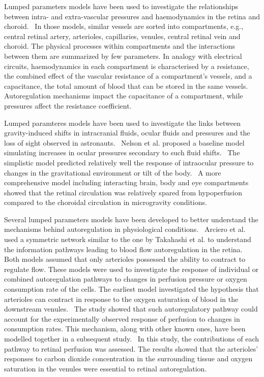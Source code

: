 \documentclass[12pt,a4paper]{journal}
\begin{document}
Lumped parameters models have been used to investigate the relationships between intra- and extra-vascular pressures and haemodynamics in the retina and choroid.~\cite{Chiaravalli_2021,Fawzi_2019,Guidoboni_2014a,Nelson_2017,Petersen_2022,Prudhomme_2021,Sala_2020,Salerni_2019}
In those models, similar vessels are sorted into compartments, e.g., central retinal artery, arterioles, capillaries, venules, central retinal vein and choroid.
The physical processes within compartments and the interactions between them are summarized by few parameters.
In analogy with electrical circuits, haemodynamics in each compartment is characterised by a resistance, the combined effect of the vascular resistance of a compartment's vessels, and a capacitance, the total amount of blood that can be stored in the same vessels.
Autoregulation mechanisms impact the capacitance of a compartment, while pressures affect the resistance coefficient.

Lumped paramteres models have been used to investigate the links between gravity-induced shifts in intracranial fluids, ocular fluids and pressures and the loss of sight observed in astronauts.~\cite{Nelson_2017,Petersen_2022,Salerni_2019}
Nelson et al. proposed a baseline model simulating increases in ocular pressures secondary to such fluid shifts.~\cite{Nelson_2017}
The simplistic model predicted relatively well the response of intraocular pressure to changes in the gravitational environment or tilt of the body.~\cite{Nelson_2017,Petersen_2022}
A more comprehensive model including interacting brain, body and eye compartments showed that the retinal circulation was relatively spared from hypoperfusion compared to the choroidal circulation in microgravity conditions.~\cite{Salerni_2019}

Several lumped parameters models have been developed to better understand the mechanisms behind autoregulation in physiological conditions.~\cite{Arciero_2008,Arciero_2013,Guidoboni_2014a}
Arciero et al. used a symmetric network similar to the one by Takahashi et al. to understand the information pathways leading to blood flow autoregulation in the retina.~\cite{Arciero_2008,Arciero_2013}
Both models assumed that only arterioles possessed the ability to contract to regulate flow.
These models were used to investigate the response of individual or combined autoregulation pathways to changes in perfusion pressure or oxygen consumption rate of the cells.
The earliest model investigated the hypothesis that arterioles can contract in response to the oxygen saturation of blood in the downstream venules.~\cite{Arciero_2008}
The study showed that such autoregulatory pathway could account for the experimentally observed response of perfusion to changes in consumption rates.
This mechanism, along with other known ones, have been modelled together in a subsequent study.~\cite{Arciero_2013}
In this study, the contributions of each pathway to retinal perfusion was assessed.
The results showed that the arterioles' responses to carbon dioxide concentration in the surrounding tissue and oxygen saturation in the venules were essential to retinal autoregulation.~\cite{Arciero_2013}
\end{document}
